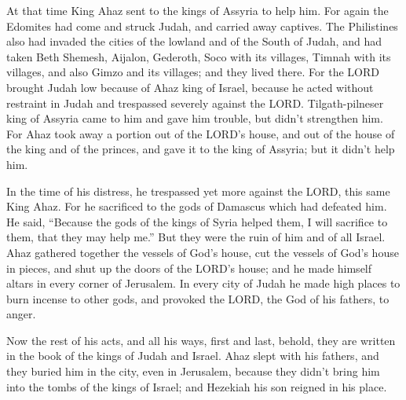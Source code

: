 \myverse{}At that time King Ahaz sent to the kings of Assyria to help
him.
\myverse{}For again the Edomites had come and struck Judah, and carried away captives.
\myverse{}The Philistines also had invaded the cities of the lowland and of the South
of Judah, and had taken Beth Shemesh, Aijalon, Gederoth, Soco with its villages, Timnah with its villages,
and also Gimzo and its villages; and they lived there.
\myverse{}For the LORD brought Judah low because of Ahaz king of Israel, because he
acted without restraint in Judah and trespassed severely against the LORD.
\myverse{}Tilgath-pilneser king of Assyria came to him and gave him trouble, but didn’t
strengthen him.
\myverse{}For Ahaz took away a portion out of the LORD’s house, and out of the house
of the king and of the princes, and gave it to the king of Assyria; but it didn’t help him.

\myverse{}In the time of his distress, he trespassed yet more against
the LORD, this same King Ahaz.
\myverse{}For he sacrificed to the gods of Damascus which had defeated him. He said,
“Because the gods of the kings of Syria helped them, I will sacrifice to them, that they may help me.”
But they were the ruin of him and of all Israel.
\myverse{}Ahaz gathered together the vessels of God’s house, cut the vessels of God’s
house in pieces, and shut up the doors of the LORD’s house; and he made himself altars in every corner
of Jerusalem.
\myverse{}In every city of Judah he made high places to burn incense to other gods,
and provoked the LORD, the God of his fathers, to anger.

\myverse{}Now the rest of his acts, and all his ways, first and last,
behold, they are written in the book of the kings of Judah and Israel.
\myverse{}Ahaz slept with his fathers, and they buried him in the city, even in Jerusalem,
because they didn’t bring him into the tombs of the kings of Israel; and Hezekiah his son reigned in his
place.


